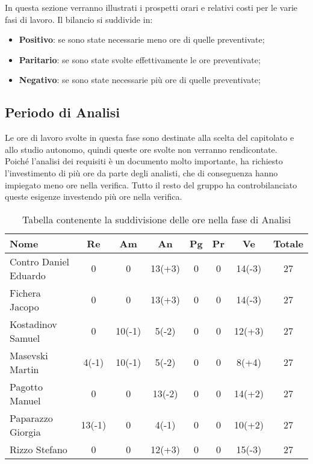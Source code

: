 \documentclass[../piano_di_progetto.tex]{subfiles}
\begin{document}
In questa sezione verranno illustrati i prospetti orari e relativi costi per le varie fasi di lavoro. Il bilancio si suddivide in:
\begin{itemize}
\item \textbf{Positivo}: se sono state necessarie meno ore di quelle preventivate;
\item \textbf{Paritario}: se sono state svolte effettivamente le ore preventivate;
\item \textbf{Negativo}: se sono state necessarie più ore di quelle preventivate;
\end{itemize}

\subsection{ Periodo di Analisi}%
\label{sub:cons_analisi}
Le ore di lavoro svolte in questa fase sono destinate alla scelta del capitolato e allo studio autonomo, quindi queste ore svolte non verranno rendicontate.\\
Poiché l'analisi dei requisiti è un documento molto importante, ha richiesto l'investimento di più ore da parte degli analisti, che di conseguenza hanno impiegato meno ore nella verifica. 
Tutto il resto del gruppo ha controbilanciato queste esigenze investendo più ore nella verifica.

\begin{table}[!ht]
	\centering
	\begin{tabular}{|l|c|c|c|c|c|c|c|}
	\hline
	\rowcolor{lightgray}
	\textbf{Nome} & \textbf{Re} & \textbf{Am} & \textbf{An} & \textbf{Pg}  & \textbf{Pr}   & \textbf{Ve} & \textbf{Totale}\\
	\hline
		Contro Daniel Eduardo & 0 & 0 & 13(+3) & 0 & 0 & 14(-3) & 27 \\
	\hline
		Fichera Jacopo & 0 & 0 & 13(+3) & 0 & 0 & 14(-3) & 27 \\
	\hline
		Kostadinov Samuel & 0 & 10(-1) & 5(-2) & 0 & 0 & 12(+3) & 27 \\			
	\hline
		Masevski Martin & 4(-1) & 10(-1) & 5(-2) & 0 & 0 & 8(+4) & 27 \\
	\hline
		Pagotto Manuel & 0 & 0 & 13(-2) & 0 & 0 & 14(+2) & 27 \\			
	\hline
		Paparazzo Giorgia & 13(-1) & 0 & 4(-1) & 0 & 0 & 10(+2) & 27 \\
	\hline
		Rizzo Stefano & 0 & 0 & 12(+3) & 0 & 0 & 15(-3) & 27 \\
	\hline	
	\end{tabular}
	\caption{Tabella contenente la suddivisione delle ore nella fase di Analisi}
\end{table}
\end{document}
